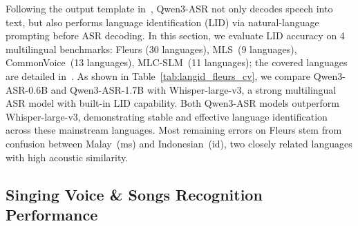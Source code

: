 Following the output template in~, Qwen3-ASR not only decodes speech into text, but also performs language identification (LID) via natural-language prompting before ASR decoding. In this section, we evaluate LID accuracy on 4 multilingual benchmarks: Fleurs (30 languages), MLS~(9 languages),  CommonVoice~(13 languages), MLC-SLM~(11 languages); the covered languages are detailed in~. As shown in Table~\ref{tab:langid_fleurs_cv}, we compare Qwen3-ASR-0.6B and Qwen3-ASR-1.7B with Whisper-large-v3, a strong multilingual ASR model with built-in LID capability. Both Qwen3-ASR models outperform Whisper-large-v3, demonstrating stable and effective language identification across these mainstream languages. Most remaining errors on Fleurs stem from confusion between Malay~(ms) and Indonesian~(id), two closely related languages with high acoustic similarity.

\subsection{Singing Voice \& Songs Recognition Performance}


